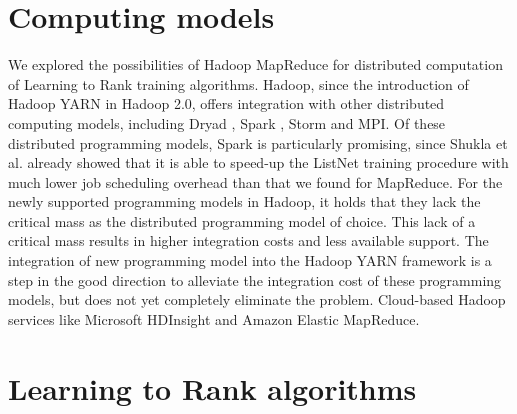 \section{Computing models}
We explored the possibilities of Hadoop MapReduce for distributed computation of Learning to Rank training algorithms. Hadoop, since the introduction of Hadoop YARN in Hadoop 2.0, offers integration with other distributed computing models, including Dryad \cite{Isard2007}, Spark \cite{Zaharia2010}, Storm \cite{Aniello2013} and MPI. Of these distributed programming models, Spark is particularly promising, since Shukla et al. \cite{Shukla2012} already showed that it is able to speed-up the ListNet training procedure with much lower job scheduling overhead than that we found for MapReduce. For the newly supported programming models in Hadoop, it holds that they lack the critical mass as the distributed programming model of choice. This lack of a critical mass results in higher integration costs and less available support. The integration of new programming model into the Hadoop YARN framework is a step in the good direction to alleviate the integration cost of these programming models, but does not yet completely eliminate the problem. Cloud-based Hadoop services like Microsoft HDInsight and Amazon Elastic MapReduce.

\section{Learning to Rank algorithms}